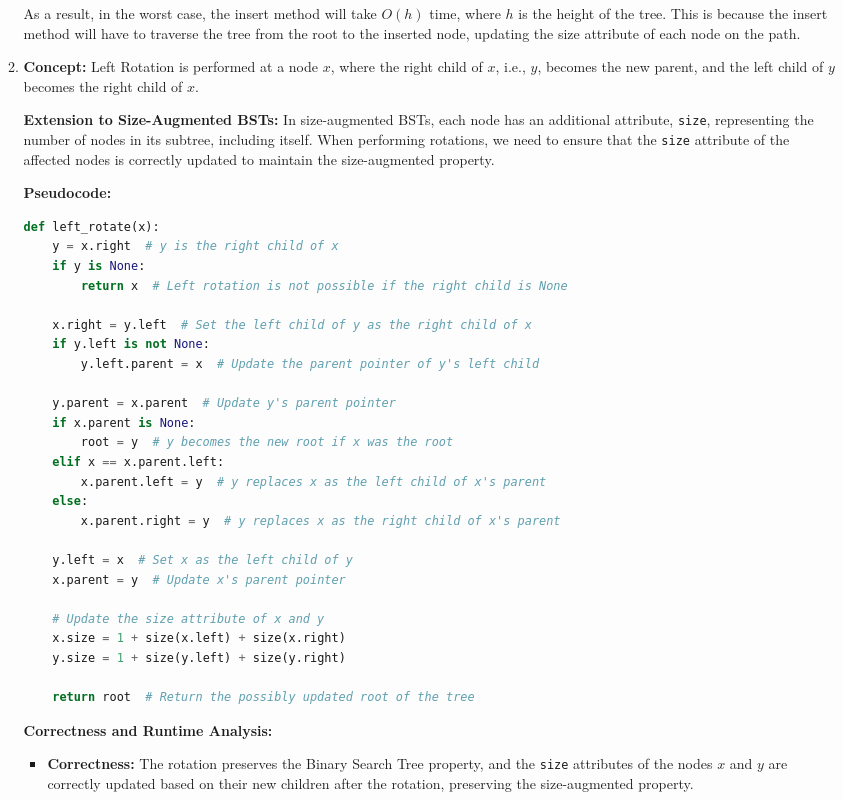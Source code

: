 \documentclass[11pt]{article}
\begin{document}
\begin{enumerate}
\begin{enumerate}
\begin{lstlisting}[language=Python]
    \end{lstlisting}
    As a result, in the worst case, the insert method will take $O(h)$ time, where $h$ is the height of the tree. This is because the insert method will have to traverse the tree from the root to the inserted node, updating the size attribute of each node on the path. 
    \newline
    \item
\textbf{Concept:} Left Rotation is performed at a node \(x\), where the right child of \(x\), i.e., \(y\), becomes the new parent, and the left child of \(y\) becomes the right child of \(x\).

\textbf{Extension to Size-Augmented BSTs:} In size-augmented BSTs, each node has an additional attribute, \texttt{size}, representing the number of nodes in its subtree, including itself. When performing rotations, we need to ensure that the \texttt{size} attribute of the affected nodes is correctly updated to maintain the size-augmented property.

\textbf{Pseudocode:}
\begin{lstlisting}[language=Python]
def left_rotate(x):
    y = x.right  # y is the right child of x
    if y is None:
        return x  # Left rotation is not possible if the right child is None
    
    x.right = y.left  # Set the left child of y as the right child of x
    if y.left is not None:
        y.left.parent = x  # Update the parent pointer of y's left child
        
    y.parent = x.parent  # Update y's parent pointer
    if x.parent is None:
        root = y  # y becomes the new root if x was the root
    elif x == x.parent.left:
        x.parent.left = y  # y replaces x as the left child of x's parent
    else:
        x.parent.right = y  # y replaces x as the right child of x's parent
        
    y.left = x  # Set x as the left child of y
    x.parent = y  # Update x's parent pointer
    
    # Update the size attribute of x and y
    x.size = 1 + size(x.left) + size(x.right)
    y.size = 1 + size(y.left) + size(y.right)
    
    return root  # Return the possibly updated root of the tree
\end{lstlisting}
\textbf{Correctness and Runtime Analysis:}
\begin{itemize}
    \item \textbf{Correctness:} The rotation preserves the Binary Search Tree property, and the \texttt{size} attributes of the nodes \(x\) and \(y\) are correctly updated based on their new children after the rotation, preserving the size-augmented property.
    

\end{itemize}
\end{enumerate}
\end{enumerate}
\end{document}
